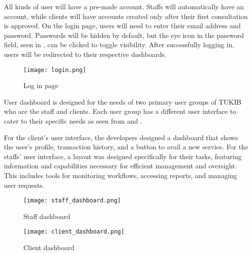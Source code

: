 \noindent All kinds of user will have a pre-made account. Staffs will automatically have an account, while clients will have accounts created only after their first consultation is approved. On the login page, users will need to enter their email address and password. Passwords will be hidden by default, but the eye icon in the password field, seen in , can be clicked to toggle visibility. After successfully logging in, users will be redirected to their respective dashboards.

\begin{figure}[h]
	\centering 
	\texttt{[image: login.png]}
	\caption{Log in page}
	\label{fig:login}
\end{figure}

User dashboard is designed for the needs of two primary user groups of TUKIB who are the staff and clients. Each user group has a different user interface to cater to their specific needs as seen from  and . 

For the client’s user interface, the developers designed a dashboard that shows the user’s profile, transaction history, and a button to avail a new service. For the staffs’ user interface, a layout was designed specifically for their tasks, featuring information and capabilities necessary for efficient management and oversight. This includes tools for monitoring workflows, accessing reports, and managing user requests.

\begin{figure}[h]
	\centering 
	\texttt{[image: staff\_dashboard.png]}
	\caption{Staff dashboard}
	\label{fig:staff_dashboard}
\end{figure}

\begin{figure}[h]
	\centering 
	\texttt{[image: client\_dashboard.png]}
	\caption{Client dashboard}
	\label{fig:client_dashboard}
\end{figure}
